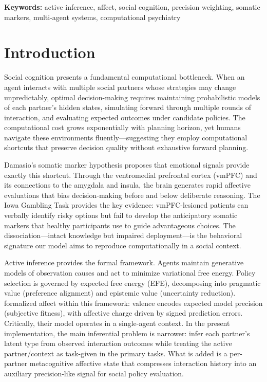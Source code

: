 \documentclass[11pt,a4paper]{article}
\begin{document}
\noindent\textbf{Keywords:} active inference, affect, social cognition, precision weighting, somatic markers, multi-agent systems, computational psychiatry

\section{Introduction}
\label{sec:intro}

Social cognition presents a fundamental computational bottleneck. When an agent interacts with multiple social partners whose strategies may change unpredictably, optimal decision-making requires maintaining probabilistic models of each partner's hidden states, simulating forward through multiple rounds of interaction, and evaluating expected outcomes under candidate policies. The computational cost grows exponentially with planning horizon, yet humans navigate these environments fluently---suggesting they employ computational shortcuts that preserve decision quality without exhaustive forward planning.

Damasio's somatic marker hypothesis \citep{damasio1994descartes} proposes that emotional signals provide exactly this shortcut. Through the ventromedial prefrontal cortex (vmPFC) and its connections to the amygdala and insula, the brain generates rapid affective evaluations that bias decision-making before and below deliberate reasoning. The Iowa Gambling Task \citep{bechara1994insensitivity,bechara1997deciding} provides the key evidence: vmPFC-lesioned patients can verbally identify risky options but fail to develop the anticipatory somatic markers that healthy participants use to guide advantageous choices. The dissociation---intact knowledge but impaired deployment---is the behavioral signature our model aims to reproduce computationally in a social context.

Active inference \citep{friston2010free,parr2022active} provides the formal framework. Agents maintain generative models of observation causes and act to minimize variational free energy. Policy selection is governed by expected free energy (EFE), decomposing into pragmatic value (preference alignment) and epistemic value (uncertainty reduction). \citet{hesp2021deeply} formalized affect within this framework: valence encodes expected model precision (subjective fitness), with affective charge driven by signed prediction errors. Critically, their model operates in a single-agent context. In the present implementation, the main inferential problem is narrower: infer each partner's latent type from observed interaction outcomes while treating the active partner/context as task-given in the primary tasks. What is added is a per-partner metacognitive affective state that compresses interaction history into an auxiliary precision-like signal for social policy evaluation.
\end{document}
